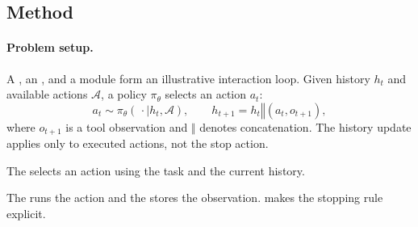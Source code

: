 \begin{samepage}
\section{Method}
\label{sec:method}
\paragraph{Problem setup.}
\label{sec:overview}
A \planner{}, an \executor{}, and a \memory{} module form an illustrative
interaction loop. Given history $h_t$ and available
actions $\mathcal{A}$, a policy $\pi_\theta$ selects an action $a_t$:
\begin{equation}
  a_t \sim \pi_\theta(\,\cdot\mid h_t,\mathcal{A}),
  \qquad h_{t+1}=h_t\mathbin{\Vert}(a_t,o_{t+1}),
  \label{eq:interaction}
\end{equation}
where $o_{t+1}$ is a tool observation and $\Vert$ denotes concatenation.
The history update applies only to executed actions, not the stop action.
\end{samepage}

\noindent{}
The \planner{} selects an action using the task and the current history.

\noindent{}
The \executor{} runs the action and the \memory{} stores the observation.
 makes the stopping rule explicit.

